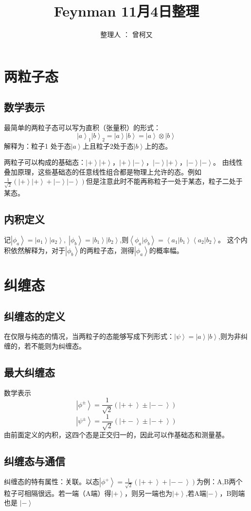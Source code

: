\documentclass[10pt,a4paper,nocap]{ctexart}
\title{Feynman 11月4日整理}
\author{整理人 ：  曾柯又}
\date{\vspace{-5ex}}
\newcommand{\ket}[1]{\left|#1\right>}
\newcommand{\braket}[2]{\left<#1|#2\right>}
\begin{document}
\maketitle
\section{两粒子态}
\subsection{数学表示}
最简单的两粒子态可以写为直积（张量积）的形式：\[\left|a\right>_1\left|b\right>_2 = \left|a\right>\left|b\right> = \left|a\right>\otimes\left|b\right> \]
解释为：粒子1 处于态\(\left|a\right>\)上且粒子2处于态\(\left|b\right>\)上的态。

两粒子可以构成的基础态：\(\left|+\right>\left|+\right>，\left|+\right>\left|-\right>，\left|-\right>\left|+\right>，\left|-\right>\left|-\right>\)。
由线性叠加原理，这些基础态的任意线性组合都是物理上允许的态。例如\(\frac{1}{\sqrt{2}}(\left|+\right>\left|+\right> + \left|-\right>\left|-\right>)\)但是注意此时不能再称粒子一处于某态，粒子二处于某态。
\subsection{内积定义}
记\(\left|\phi_a\right> = \left|a_1\right>\left|a_2\right>,\;\left|\phi_b\right> = \ket{b_1}\ket{b_2}\),则\(\braket{\phi_a}{\phi_b} = \braket{a_1}{b_1}\braket{a_2}{b_2}\)。
这个内积依然解释为，对于\(\left|\phi_b\right>\)的两粒子态，测得\(\left|\phi_a\right>\)的概率幅。
\section{纠缠态}
\subsection{纠缠态的定义}
在仅限与纯态的情况，当两粒子的态能够写成下列形式：\(\ket{\psi} = \ket{a}\ket{b}\),则为非纠缠的，若不能则为纠缠态。
\subsection{最大纠缠态}
数学表示\[\ket{\phi^\pm} = \frac{1}{\sqrt{2}}(\ket{++} \pm \ket{--})\]
\[\ket{\psi^\pm} = \frac{1}{\sqrt{2}}(\ket{+-} \pm \ket{-+})\]
由前面定义的内积，这四个态是正交归一的，因此可以作基础态和测量基。\\
\subsection{纠缠态与通信}
纠缠态的特有属性：关联。以态\(\ket{\phi^+} = \frac{1}{\sqrt{2}}(\ket{++} + \ket{--})\)为例：A,B两个粒子可相隔很远。若一端（A端）得\(\ket{+}\)，则另一端也为\(\ket{+}\),若A端\(\ket{-}\)，B则端也是
\(\ket{-}\)
\end{document}
